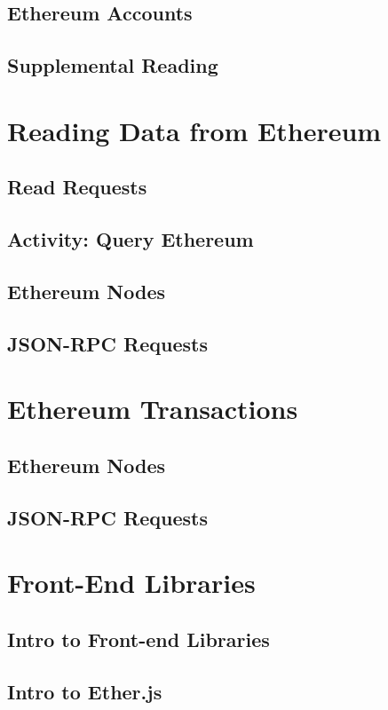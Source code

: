 \documentclass[a4paper, oneside]{book}
\begin{document}
\subsection{Ethereum Accounts}
\subsection{Supplemental Reading}

\section{Reading Data from Ethereum}
\subsection{Read Requests}
\subsection{Activity: Query Ethereum}
\subsection{Ethereum Nodes}
\subsection{JSON-RPC Requests}

\section{Ethereum Transactions}
\subsection{Ethereum Nodes}
\subsection{JSON-RPC Requests}

\section{Front-End Libraries}
\subsection{Intro to Front-end Libraries}
\subsection{Intro to Ether.js}
\end{document}

